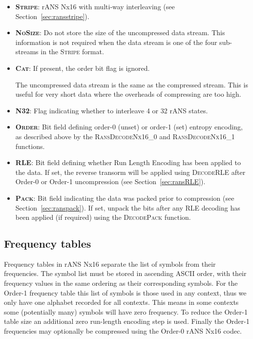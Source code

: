 \documentclass[a4paper]{article}
\begin{document}
\begin{itemize}
\item{\textbf{\textsc{Stripe}}:}
rANS Nx16 with multi-way interleaving (see Section~\ref{sec:ransstripe}).

\item{\textbf{\textsc{NoSize}}:}
Do not store the size of the uncompressed data stream.
This information is not required when the data stream is one of the four sub-streams in the \textsc{Stripe} format.

\item{\textbf{\textsc{Cat}}:}
If present, the order bit flag is ignored.

The uncompressed data stream is the same as the compressed stream.
This is useful for very short data where the overheads of compressing are too high.

\item{\textbf{\textsc{N32}}:}
Flag indicating whether to interleave 4 or 32 rANS states.

\item{\textbf{\textsc{Order}}:}
Bit field defining order-0 (unset) or order-1 (set) entropy encoding, as described above by the \textsc{RansDecodeNx16\_0} and \textsc{RansDecodeNx16\_1} functions.

\item{\textbf{\textsc{RLE}}:}
Bit field defining whether Run Length Encoding has been applied to the data.  If set, the reverse transorm will be applied using \textsc{DecodeRLE} after Order-0 or Order-1 uncompression (see Section~\ref{sec:ransRLE}).

\item{\textbf{\textsc{Pack}}:}
Bit field indicating the data was packed prior to compression (see Section~\ref{sec:ranspack}).  If set, unpack the bits after any RLE decoding has been applied (if required) using the \textsc{DecodePack} function.
\end{itemize}

\subsection{Frequency tables}

Frequency tables in rANS Nx16 separate the list of symbols from their
frequencies.  The symbol list must be stored in ascending ASCII order,
with their frequency values in the same ordering as their
corresponding symbols.  For the Order-1 frequency table this list of
symbols is those used in any context, thus we only have one alphabet
recorded for all contexts.  This means in some contexts some
(potentially many) symbols will have zero frequency.  To reduce the
Order-1 table size an additional zero run-length encoding step is
used.  Finally the Order-1 frequencies may optionally be compressed
using the Order-0 rANS Nx16 codec.
\end{document}
